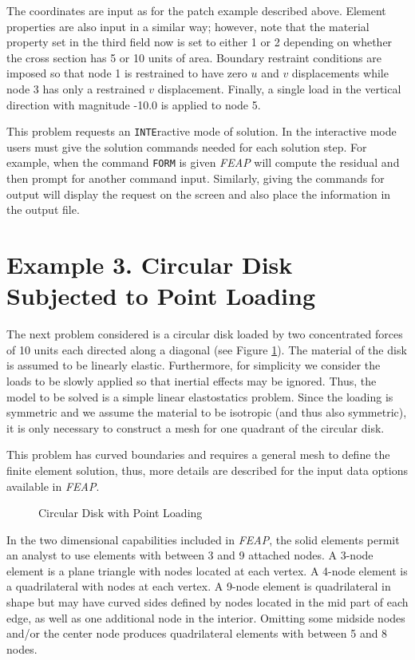 The coordinates are input as for the patch example described above.  Element
properties are also input in a similar way; however, note that the material
property set in the third field now is set to either 1 or 2 depending on
whether the cross section has 5 or 10 units of area.
Boundary restraint conditions are imposed so that node 1 is restrained
to have zero $u$ and $v$ displacements while node 3 has only a restrained
$v$ displacement.  Finally, a single load in the vertical direction
with magnitude -10.0 is applied to node 5.

This problem requests an {\tt INTE}ractive mode of solution.  In the interactive
mode users must give the solution commands needed for each solution step.
For example, when the command {\tt FORM} is given {\sl FEAP} will compute
the residual and then prompt for another command input.  Similarly, 
giving the commands for output will display the request on the screen and
also place the information in the output file.

\section{Example 3. Circular Disk Subjected to Point Loading}
\label{ex3}

The next problem considered is a circular disk loaded by
two concentrated forces of 10 units each
directed along a diagonal (see Figure \ref{fig3}). The material
of the disk is assumed to be linearly elastic.  Furthermore, for simplicity
we consider the loads to be slowly applied so that inertial effects may
be ignored.  Thus, the model to be solved is a simple linear elastostatics
problem.  Since the loading is symmetric and we assume the material to be
isotropic (and thus also symmetric), it is only necessary to construct a mesh
for one quadrant of the circular disk.

This problem has curved boundaries and requires a general mesh
to define the finite element solution, thus, more details
are described for the input data options available in {\sl FEAP}.

\begin{figure}[ht!]
\epsfxsize=1.6in
\centerline {\hfil {} \hfil}
\caption{Circular Disk with Point Loading}
\label{fig3}
\end{figure}

In the two dimensional capabilities included in
{\sl FEAP}, the solid elements permit an analyst to use elements with
between 3 and 9 attached nodes.  A 3-node element is a plane triangle
with nodes located at each vertex.  A 4-node element is a quadrilateral with
nodes at each vertex.  A 9-node element is quadrilateral in shape but
may have curved sides defined by nodes located in the mid part of
each edge, as well as one
additional node in the interior.  Omitting some midside nodes and/or
the center node produces quadrilateral elements with between 5 and 8 nodes.

